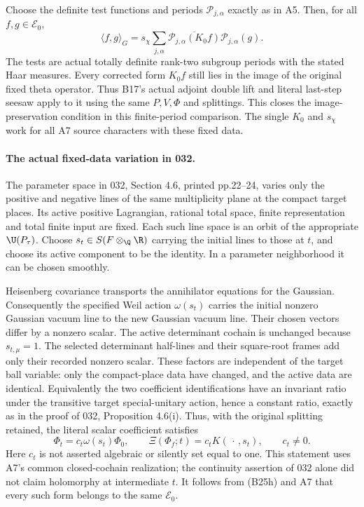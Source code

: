 Choose the definite test functions and
periods $\mathcal P_{j,\alpha}$ exactly as
in A5.  Then, for all $f,g\in\mathcal E_0$,
\[
 \langle f,g\rangle_G
   =s_\chi\sum_{j,\alpha}
       \overline{\mathcal P_{j,\alpha}(K_0f)}
                        \mathcal P_{j,\alpha}(g).
 \tag{B25g}
\]
The tests are actual totally definite rank-two
subgroup periods with the stated Haar measures.
Every corrected form $K_0f$ still lies in the
image of the original fixed theta operator.
Thus B17's actual adjoint double lift and
literal last-step seesaw apply to it using
the same $P,V,\Phi$ and splittings.
This closes the image-preservation condition
in this finite-period comparison.  The
single $K_0$ and $s_\chi$ work for all A7
source characters with these fixed data.

\paragraph{The actual fixed-data variation in 032.}
The parameter space in 032, Section 4.6,
printed pp.22--24, varies only the positive
and negative lines of the same multiplicity
plane at the compact target places.  Its
active positive Lagrangian, rational total
space, finite representation and total finite
input are fixed.  Each such line space is
an orbit of the appropriate $\U(P_\tau)$.
Choose $s_t\in S(F\otimes_\Q\R)$ carrying
the initial lines to those at $t$, and choose
its active component to be the identity.
In a parameter neighborhood it can be
chosen smoothly.

Heisenberg covariance transports the
annihilator equations for the Gaussian.
Consequently the specified Weil action
$\omega(s_t)$ carries the initial nonzero
Gaussian vacuum line to the new Gaussian
vacuum line.  Their chosen vectors differ
by a nonzero scalar.  The active determinant
cochain is unchanged because $s_{t,\mu}=1$.
The selected determinant half-lines and
their square-root frames add only their
recorded nonzero scalar.  These factors
are independent of the target ball variable:
only the compact-place data have changed,
and the active data are identical.  Equivalently
the two coefficient identifications have an
invariant ratio under the transitive target
special-unitary action, hence a constant
ratio, exactly as in the proof of 032,
Proposition 4.6(i).
Thus, with the original splitting retained,
the literal scalar coefficient satisfies
\[
       \Phi_t=c_t\omega(s_t)\Phi_0,
       \qquad
       \Xi(\Phi_f;t)=c_tK(\,\cdot\,,s_t),
       \qquad c_t\ne0.
 \tag{B25h}
\]
Here $c_t$ is not asserted algebraic or
silently set equal to one.  This statement
uses A7's common closed-cochain realization;
the continuity assertion of 032 alone did
not claim holomorphy at intermediate $t$.
It follows from (B25h) and A7 that every
such form belongs to the same $\mathcal E_0$.

